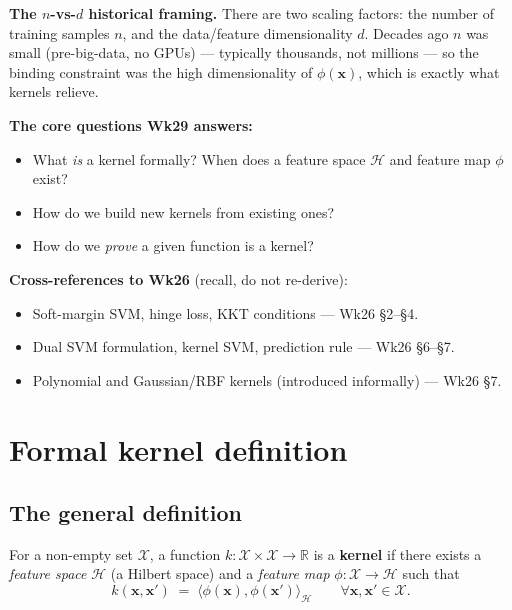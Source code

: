 \documentclass[11pt, a4paper]{article}
\begin{document}
\textbf{The $n$-vs-$d$ historical framing.} There are two scaling factors: the number of training samples $n$, and the data/feature dimensionality $d$. Decades ago $n$ was small (pre-big-data, no GPUs) — typically thousands, not millions — so the binding constraint was the high dimensionality of $\phi(\mathbf{x})$, which is exactly what kernels relieve.

\textbf{The core questions Wk29 answers:}
\begin{itemize}
  \item What \emph{is} a kernel formally? When does a feature space $\mathcal{H}$ and feature map $\phi$ exist?
  \item How do we build new kernels from existing ones?
  \item How do we \emph{prove} a given function is a kernel?
\end{itemize}

\textbf{Cross-references to Wk26} (recall, do not re-derive):
\begin{itemize}
  \item Soft-margin SVM, hinge loss, KKT conditions — Wk26 §2--§4.
  \item Dual SVM formulation, kernel SVM, prediction rule — Wk26 §6--§7.
  \item Polynomial and Gaussian/RBF kernels (introduced informally) — Wk26 §7.
\end{itemize}

\section{Formal kernel definition}

\subsection{The general definition}

\begin{defbox}
For a non-empty set $\mathcal{X}$, a function $k : \mathcal{X}\times\mathcal{X} \to \mathbb{R}$ is a \textbf{kernel} if there exists a \emph{feature space} $\mathcal{H}$ (a Hilbert space) and a \emph{feature map} $\phi : \mathcal{X} \to \mathcal{H}$ such that
\[
k(\mathbf{x}, \mathbf{x}') \;=\; \langle\phi(\mathbf{x}), \phi(\mathbf{x}')\rangle_{\mathcal{H}} \qquad \forall \mathbf{x}, \mathbf{x}' \in \mathcal{X}.
\]
\end{defbox}
\end{document}
